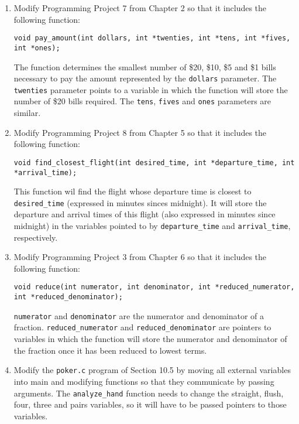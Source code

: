 \documentclass[12pt]{article}
\begin{document}
\begin{enumerate}[1.]
    \item Modify Programming Project 7 from Chapter 2 so that it includes the following
    function:

    \bigskip

    \texttt{void pay\_amount(int dollars, int *twenties, int *tens, int *fives, int *ones);}

    \bigskip

    The function determines the smallest number of \$20, \$10, \$5 and \$1 bills
    necessary to pay the amount represented by the \texttt{dollars} parameter. The \texttt{twenties}
    parameter points to a variable in which the function will store the number of
    \$20 bills required. The \texttt{tens}, \texttt{fives} and \texttt{ones} parameters are similar.

    \bigskip

    \item Modify Programming Project 8 from Chapter 5 so that it includes the
    following function:

    \bigskip

    \texttt{void find\_closest\_flight(int desired\_time, int *departure\_time, int *arrival\_time);}

    \bigskip

    This function wil find the flight whose departure time is closest to \texttt{desired\_time}
    (expressed in minutes sinces midnight). It will store the departure and arrival times of
    this flight (also expressed in minutes since midnight) in the variables pointed to by
    \texttt{departure\_time} and \texttt{arrival\_time}, respectively.

    \item Modify Programming Project 3 from Chapter 6 so that it includes the
    following function:

    \bigskip

    \texttt{void reduce(int numerator, int denominator, int *reduced\_numerator,\\
    int *reduced\_denominator);}

    \bigskip

    \texttt{numerator} and \texttt{denominator} are the numerator and denominator
    of a fraction. \texttt{reduced\_numerator} and \texttt{reduced\_denominator} are pointers to
    variables in which the function will store the numerator and denominator of
    the fraction once it has been reduced to lowest terms.

    \item Modify the \texttt{poker.c} program of Section 10.5 by moving all external variables
    into main and modifying functions so that they communicate by passing arguments.
    The \texttt{analyze\_hand} function needs to change the straight, flush, four, three
    and pairs variables, so it will have to be passed pointers to those variables.

\end{enumerate}
\end{document}
